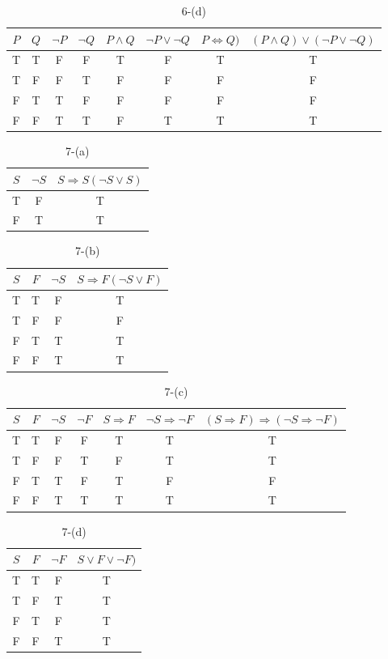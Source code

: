 \documentclass{article}
\begin{document}
	\begin{table}[h]
	\centering
	\caption{6-(d)}
	\begin{tabular}{|c|c|c|c|c|c|c|c|}
	\hline
	$P$ & $Q$ & $\neg P$ & $\neg Q$ & $P \land Q$ & $\neg P \lor \neg Q$ & $P \Leftrightarrow Q)$ & $(P \land Q) \lor (\neg P \lor \neg Q)$ \\ \hline
	T & T & F & F & T & F & T & T \\ \hline
	T & F & F & T & F & F & F & F \\ \hline
	F & T & T & F & F & F & F & F \\ \hline
	F & F & T & T & F & T & T & T \\ \hline
	\end{tabular}
	\end{table}		



	\begin{table}[h]
	\centering
	\caption{7-(a)}
	\begin{tabular}{|c|c|c|}
	\hline
	$S$ & $\neg S$ & $S\Rightarrow S (\neg S \lor S)$  \\ \hline
	T & F & T \\ \hline
	F & T & T \\ \hline
	\end{tabular}
	\end{table}	
	

	\begin{table}[h]
	\centering
	\caption{7-(b)}
	\begin{tabular}{|c|c|c|c|}
	\hline
	$S$ & $F$ & $\neg S$ & $S\Rightarrow F (\neg S \lor F)$  \\ \hline
	T & T & F & T\\ \hline
	T & F & F & F\\ \hline
	F & T & T & T\\ \hline
	F & F & T & T\\ \hline
	\end{tabular}
	\end{table}	
	

	\begin{table}[h]
	\centering
	\caption{7-(c)}
	\begin{tabular}{|c|c|c|c|c|c|c|}
	\hline
	$S$ & $F$ & $\neg S$ & $\neg F$ & $S\Rightarrow F$ & $\neg S \Rightarrow \neg F$ & $(S\Rightarrow F)\Rightarrow (\neg S \Rightarrow \neg F)$ \\ \hline
	T & T & F & F & T & T & T\\ \hline
	T & F & F & T & F & T & T\\ \hline
	F & T & T & F & T & F & F\\ \hline
	F & F & T & T & T & T & T\\ \hline
	\end{tabular}
	\end{table}	
	
	
	\begin{table}[h]
	\centering
	\caption{7-(d)}
	\begin{tabular}{|c|c|c|c|}
	\hline
	$S$ & $F$ & $\neg F$ & $S \lor F \lor \neg F)$  \\ \hline
	T & T & F & T\\ \hline
	T & F & T & T\\ \hline
	F & T & F & T\\ \hline
	F & F & T & T\\ \hline
	\end{tabular}
	\end{table}	
\end{document}
